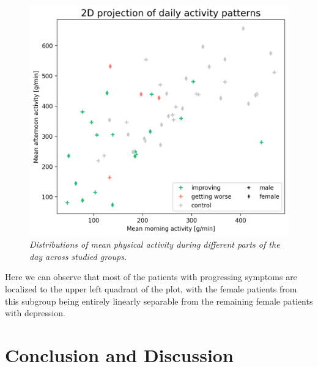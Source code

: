 \documentclass[12pt]{article}
\begin{document}
\begin{figure}[!t]
    \centering
    \includegraphics[width=.99\textwidth]{images/2d_act.png}
    \captionsetup{justification=centering}
    \caption{\textit{Distributions of mean physical activity during different parts of the day across studied groups.}}
    \label{fig:2d_act}
\end{figure}

Here we can observe that most of the patients with progressing symptoms are localized to the upper left quadrant of the plot, with the female patients from this subgroup being entirely linearly separable from the remaining female patients with depression.

\section{Conclusion and Discussion}



\end{document}
